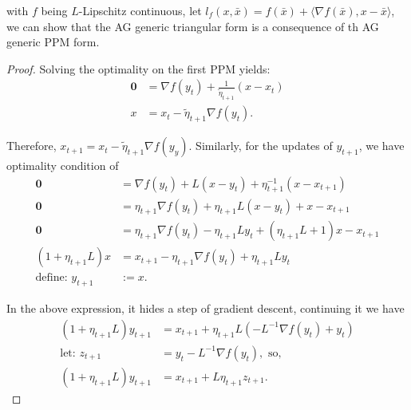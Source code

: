 \documentclass[12pt]{article}
\begin{document}
        \begin{proposition}
            with $f$ being $L$-Lipschitz continuous, let $l_f(x, \bar x) = f(\bar x) + \langle \nabla f(\bar x), x - \bar x\rangle$, we can show that the AG generic triangular form is a consequence of th AG generic PPM form. 
        \end{proposition}
        \begin{proof}
            Solving the optimality on the first PPM yields: 
            \begin{align*}
                \mathbf 0 &= \nabla f(y_t) + 
                \frac{1}{\tilde \eta_{t + 1}} (x - x_t)
                \\
                x &= x_t - \tilde \eta_{t + 1} \nabla f(y_t).
            \end{align*}

            Therefore, $x_{t + 1} = x_t - \tilde \eta_{t + 1}\nabla f(y_y)$. 
            Similarly, for the updates of $y_{t + 1}$, we have optimality condition of 
            \begin{align*}
                \mathbf 0 &= \nabla f (y_t) + L (x - y_t) + \eta_{t + 1}^{-1} (x - x_{t + 1})
                \\
                \mathbf 0 &= \eta_{t + 1}\nabla f (y_t) + \eta_{t + 1}L (x - y_t) + x - x_{t + 1}
                \\
                \mathbf 0 &= 
                \eta_{t + 1}\nabla f(y_t) -\eta_{t + 1} Ly_t + (\eta_{t + 1}L + 1)x - x_{t + 1}
                \\
                (1 + \eta_{t + 1}L)x
                &= 
                x_{t + 1} - \eta_{t + 1}\nabla f(y_t) + \eta_{t + 1}L y_t
                \\
                \text{define: } y_{t + 1} &:= x. 
            \end{align*}

            In the above expression, it hides a step of gradient descent, continuing it we have 
            \begin{align*}
                (1 + \eta_{t + 1}L)y_{t + 1} &= 
                x_{t + 1}  + \eta_{t + 1}L (-L^{-1}\nabla f(y_t) + y_t)
                \\
                \text{let: } z_{t + 1} &= y_t - L^{-1}\nabla f(y_t), \text{ so, }
                \\
                (1 + \eta_{t + 1}L)y_{t + 1} &= 
                x_{t + 1} + L\eta_{t + 1}z_{t + 1}. 
            \end{align*}


\end{proof}
\end{document}
